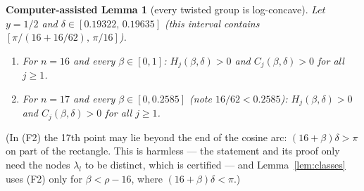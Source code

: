 \documentclass[11pt,a4paper]{article}
\newtheorem{calemma}[theorem]{Computer-assisted Lemma}
\theoremstyle{definition}
\begin{document}
\begin{calemma}[every twisted group is log-concave]\label{lem:family}
Let $y=1/2$ and $\delta\in[0.19322,\,0.19635]$ (this interval contains $[\pi/(16+16/62),\,\pi/16]$).
\begin{enumerate}
\item[\textup{(F1)}] For $n=16$ and every $\beta\in[0,1]$: $H_j(\beta,\delta)>0$ and $C_j(\beta,\delta)>0$ for all $j\ge1$.
\item[\textup{(F2)}] For $n=17$ and every $\beta\in[0,0.2585]$ (note $16/62<0.2585$): $H_j(\beta,\delta)>0$ and $C_j(\beta,\delta)>0$ for all $j\ge1$.
\end{enumerate}
\end{calemma}
(In (F2) the 17th point may lie beyond the end of the cosine arc: $(16+\beta)\delta>\pi$ on part of the rectangle. This is harmless --- the statement and its proof only need the nodes $\lambda_l$ to be distinct, which is certified --- and Lemma~\ref{lem:classes} uses (F2) only for $\beta<\rho-16$, where $(16+\beta)\delta<\pi$.)
\end{document}
